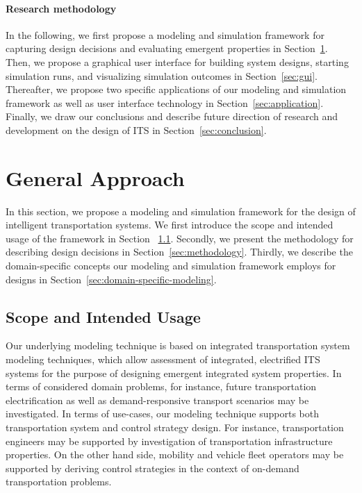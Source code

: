 \documentclass[10pt,twocolumn]{article}
\begin{document}
\paragraph{Research methodology}

In the following, we first propose a modeling and simulation framework for capturing design decisions and evaluating emergent properties in Section~\ref{sec:approach}.
Then, we propose a graphical user interface for building system designs, starting simulation runs, and visualizing simulation outcomes in Section~\ref{sec:gui}.
Thereafter, we propose two specific applications of our modeling and simulation framework as well as user interface technology in Section~\ref{sec:application}.
Finally, we draw our conclusions and describe future direction of research and development on the design of ITS in Section~\ref{sec:conclusion}. 

\section{General Approach}
\label{sec:approach}

In this section, we propose a modeling and simulation framework for the design of intelligent transportation systems.
We first introduce the scope and intended usage of the framework in Section ~\ref{sec:scope}.
Secondly, we present the methodology for describing design decisions in Section~\ref{sec:methodology}.
Thirdly, we describe the domain-specific concepts our modeling and simulation framework employs for designs in Section~\ref{sec:domain-specific-modeling}.

\subsection{Scope and Intended Usage}
\label{sec:scope}
Our underlying modeling technique is based on integrated transportation system modeling techniques, which allow assessment of integrated, electrified ITS systems for the purpose of designing emergent integrated system properties. In terms of considered domain problems, for instance, future transportation electrification as well as demand-responsive transport scenarios may be investigated. In terms of use-cases, our modeling technique supports both transportation system and control strategy design. For instance, transportation engineers may be supported by investigation of transportation infrastructure properties. On the other hand side, mobility and vehicle fleet operators may be supported by deriving control strategies in the context of on-demand transportation problems.
\end{document}
